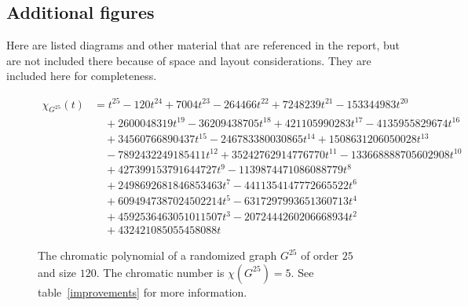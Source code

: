 \documentclass{cslthse-msc}
\begin{document}
\begin{appendices}
 
 \chapter{Additional figures}
 Here are listed diagrams and other material that are referenced in the report, but are not included there because of space and layout considerations. They are included here for completeness.
 
 \begin{figure}[h]
  \begin{equation*}
   \begin{split}
     \chi_{G^{25}}(t) & = t^{25} -120t^{24} + 7004t^{23} -264466t^{22} + 7248239t^{21} - 153344983t^{20} \\
     & \quad  + 2600048319t^{19} - 36209438705t^{18} + 421105990283t^{17} - 4135955829674t^{16} \\
     & \quad  + 34560766890437t^{15} - 246783380030865t^{14} + 1508631206050028t^{13} \\
     & \quad  - 7892432249185411t^{12} + 35242762914776770t^{11} - 133668888705602908t^{10} \\
     & \quad  + 427399153791644727t^{9} - 1139874471086088779t^8 \\
     & \quad  + 2498692681846853463t^7 - 4411354147772665522t^6 \\
     & \quad  + 6094947387024502214t^5 - 6317297993651360713t^4 \\
     & \quad  + 4592536463051011507t^3 - 2072444260206668934t^2 \\
     & \quad  + 432421085055458088t
   \end{split}
  \end{equation*}
  \caption{The chromatic polynomial of a randomized graph $G^{25}$ of order $25$ and size $120$. The chromatic number is $\chi(G^{25}) = 5$. See table~\ref{improvements} for more information.}
  \label{g25}
 \end{figure}
 

\end{appendices}
\end{document}
